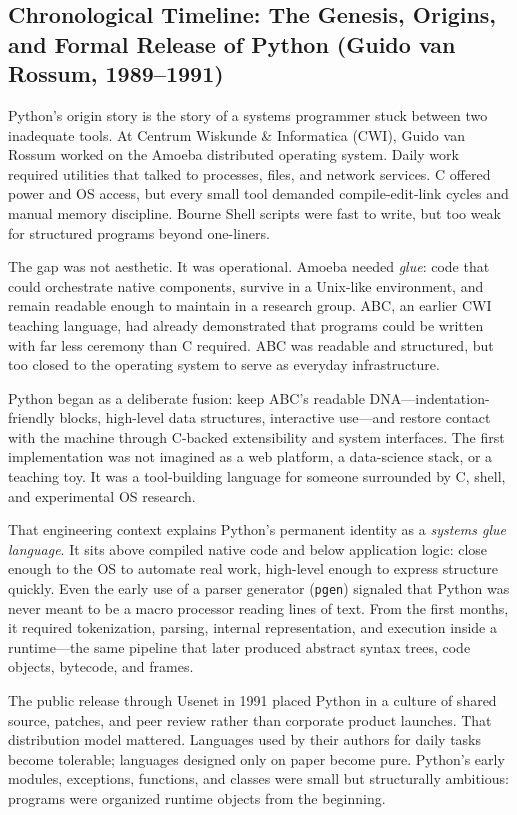 \subsection{Chronological Timeline: The Genesis, Origins, and Formal Release of Python (Guido van Rossum, 1989--1991)}

Python's origin story is the story of a systems programmer stuck between two inadequate tools. At Centrum Wiskunde \& Informatica (CWI), Guido van Rossum worked on the Amoeba distributed operating system. Daily work required utilities that talked to processes, files, and network services. C offered power and OS access, but every small tool demanded compile-edit-link cycles and manual memory discipline. Bourne Shell scripts were fast to write, but too weak for structured programs beyond one-liners.

The gap was not aesthetic. It was operational. Amoeba needed \emph{glue}: code that could orchestrate native components, survive in a Unix-like environment, and remain readable enough to maintain in a research group. ABC, an earlier CWI teaching language, had already demonstrated that programs could be written with far less ceremony than C required. ABC was readable and structured, but too closed to the operating system to serve as everyday infrastructure.

Python began as a deliberate fusion: keep ABC's readable DNA---indentation-friendly blocks, high-level data structures, interactive use---and restore contact with the machine through C-backed extensibility and system interfaces. The first implementation was not imagined as a web platform, a data-science stack, or a teaching toy. It was a tool-building language for someone surrounded by C, shell, and experimental OS research.

That engineering context explains Python's permanent identity as a \emph{systems glue language}. It sits above compiled native code and below application logic: close enough to the OS to automate real work, high-level enough to express structure quickly. Even the early use of a parser generator (\texttt{pgen}) signaled that Python was never meant to be a macro processor reading lines of text. From the first months, it required tokenization, parsing, internal representation, and execution inside a runtime---the same pipeline that later produced abstract syntax trees, code objects, bytecode, and frames.

The public release through Usenet in 1991 placed Python in a culture of shared source, patches, and peer review rather than corporate product launches. That distribution model mattered. Languages used by their authors for daily tasks become tolerable; languages designed only on paper become pure. Python's early modules, exceptions, functions, and classes were small but structurally ambitious: programs were organized runtime objects from the beginning.

